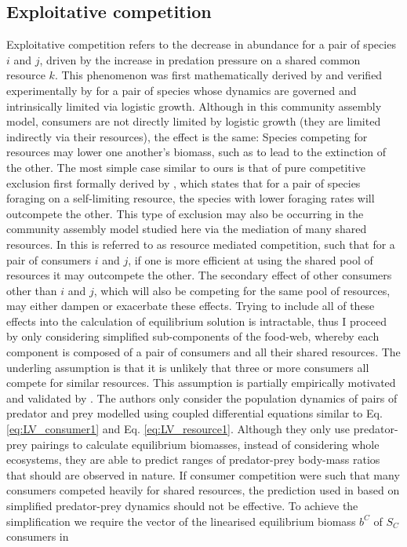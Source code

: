 \documentclass[a4paper]{report}
\begin{document}
\subsection{Exploitative competition}
\label{sec:exp_comp}

Exploitative competition refers to the decrease in abundance for a pair of species $i$ and $j$, driven by the increase in predation pressure on a shared common resource $k$. This phenomenon was first mathematically derived by \citep{schoner1976} and verified experimentally by \citep{Jensen1987} for a pair of species whose dynamics are governed and intrinsically limited via logistic growth. Although in this community assembly model, consumers are not directly limited by logistic growth (they are limited indirectly via their resources), the effect is the same: Species competing for resources may lower one another's biomass, such as to lead to the extinction of the other. The most simple case similar to ours is that of pure competitive exclusion first formally derived by \citep{Hardin1960}, which states that for a pair of species foraging on a self-limiting resource, the species with lower foraging rates will outcompete the other. This type of exclusion may also be occurring in the community assembly model studied here via the mediation of many shared resources. In \citep{Rossberg2013} this is referred to as resource mediated competition, such that for a pair of consumers $i$ and $j$, if one is more efficient at using the shared pool of resources it may outcompete the other. The secondary effect of other consumers other than $i$ and $j$, which will also be competing for the same pool of resources, may either dampen or exacerbate these effects. Trying to include all of these effects into the calculation of equilibrium solution is intractable, thus I proceed by only considering simplified sub-components of the food-web, whereby each component is composed of a pair of consumers and all their shared resources. The underling assumption is that it is unlikely that three or more consumers all compete for similar resources. This assumption is partially empirically motivated and validated by \citep{Pawar2019}. The authors only consider the population dynamics of pairs of predator and prey modelled using coupled differential equations similar to Eq. \eqref{eq:LV_consumer1} and Eq. \eqref{eq:LV_resource1}. Although they only use predator-prey pairings to calculate equilibrium biomasses, instead of considering whole ecosystems, they are able to predict ranges of predator-prey body-mass ratios that should are observed in nature. If consumer competition were such that many consumers competed heavily for shared resources, the prediction used in \citep{Pawar2019} based on simplified predator-prey dynamics should not be effective. To achieve the simplification we require the vector of the linearised equilibrium biomass $b^{C}$ of $S_{C}$ consumers in
\end{document}

